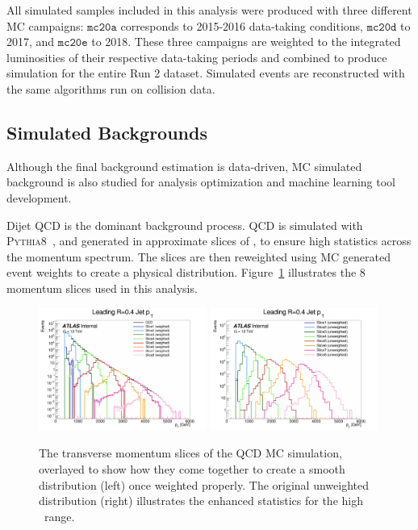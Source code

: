 All simulated samples included in this analysis were produced with three different MC campaigns: $\texttt{mc20a}$ corresponds to 2015-2016 data-taking conditions, $\texttt{mc20d}$ to 2017, and $\texttt{mc20e}$ to 2018. These three campaigns are weighted to the integrated luminosities of their respective data-taking periods and combined to produce simulation for the entire Run 2 dataset. Simulated events are reconstructed with the same algorithms run on collision data. 


\subsection{Simulated Backgrounds}
\label{subsec:bkg_mc}

Although the final background estimation is data-driven, MC simulated background is also studied for analysis optimization and machine learning tool development.\par

Dijet QCD is the dominant background process. QCD is simulated with \textsc{Pythia8}~\cite{pythia}, and generated in approximate slices of \pt, to ensure high statistics across the momentum spectrum. The slices are then reweighted using MC generated event weights to create a physical distribution. Figure~\ref{fig:jzslices} illustrates the 8 momentum slices used in this analysis.

\begin{figure}
        \centering
	\includegraphics[width=0.49\textwidth]{figures/ch6/jz_slices}
	\includegraphics[width=0.49\textwidth]{figures/ch6/jz_slices_uw}
	\caption{The transverse momentum slices of the QCD MC simulation, overlayed to show how they come together to create a smooth distribution (left) once weighted properly. The original unweighted distribution (right) illustrates the enhanced statistics for the high \pt~range. 
	\label{fig:jzslices}}
\end{figure}

